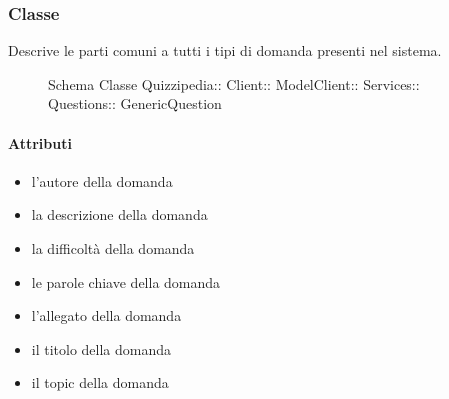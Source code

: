 \subsubsection{Classe }
Descrive le parti comuni a tutti i tipi di domanda presenti nel sistema.
\begin{figure}[H]
\centering
\noindent{}
\caption[Schema Classe GenericQuestion]{Schema Classe Quizzipedia:: Client:: ModelClient:: Services:: Questions:: GenericQuestion}
\end{figure}
\paragraph{Attributi}
\begin{itemize}
\item {}
\newline
l'autore della domanda
\item {}
\newline
la descrizione della domanda
\item {}
\newline
la difficoltà della domanda
\item {}
\newline
le parole chiave della domanda
\item {}
\newline
l'allegato della domanda
\item {}
\newline
il titolo della domanda
\item {}
\newline
il topic della domanda
\end{itemize}
